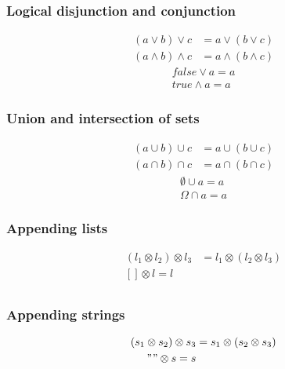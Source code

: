 \documentclass{article}
\begin{document}
    \subsubsection{Logical disjunction and conjunction}

    \begin{align*}
        (a \vee   b) \vee   c &= a \vee   (b \vee   c) \\
        (a \wedge b) \wedge c &= a \wedge (b \wedge c)
    \end{align*}
    \begin{align*}
        false \vee   a = a \\
        true  \wedge a = a 
    \end{align*}

    \subsubsection{Union and intersection of sets}

    \begin{align*}
        (a \cup b) \cup c &= a \cup (b \cup c) \\
        (a \cap b) \cap c &= a \cap (b \cap c)
    \end{align*}
    \begin{align*}
        \emptyset \cup a = a \\
        \Omega    \cap a = a 
    \end{align*}

    \subsubsection{Appending lists}

    \begin{align*}
        (l_1 \otimes l_2) \otimes l_3 &= l_1 \otimes (l_2 \otimes l_3) \\
        [] \otimes l = l \\
    \end{align*}

    \subsubsection{Appending strings}

    \begin{align*}
        (s_1 \otimes s_2) \otimes s_3 &= s_1 \otimes (s_2 \otimes s_3) \\
        "" \otimes s = s \\
    \end{align*}
\end{document}
